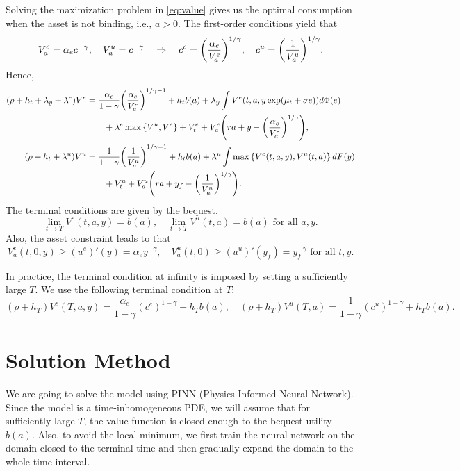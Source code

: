 \documentclass[a4paper, 12pt]{article}
\begin{document}
Solving the maximization problem in \cref{eq:value} gives us the optimal consumption 
when the asset is not binding, i.e., $a>0$. The first-order conditions yield that 
\begin{equation}
    V_a^e = \alpha_e c^{-\gamma}, \quad V_a^u = c^{-\gamma} 
    \quad \Rightarrow\quad 
    c^e = \pth{\frac{\alpha_e}{V^e_a}}^{1/\gamma}, \quad 
    c^u = \pth{\frac{1}{V^u_a}}^{1/\gamma}.
\end{equation}
Hence, 
\begin{align}
    (\rho + h_t + \lambda_y + \lambda^e)V^e &= \frac{\alpha_e}{1-\gamma}\pth{\frac{\alpha_e}{V^e_a}}^{1/\gamma - 1} + h_tb(a) + \lambda_y\int V^e(t,a,y\exp(\mu_t + \sigma e))d\Phi(e) \nonumber \\
    &\qquad + \lambda^e\max\set{V^u, V^e} + V^e_t + V^e_a\pth{ra + y - \pth{\frac{\alpha_e}{V^e_a}}^{1/\gamma}}, \label{eq:value_e}\\
    (\rho + h_t + \lambda^u)V^u &= \frac{1}{1-\gamma}\pth{\frac{1}{V^u_a}}^{1/\gamma - 1} + h_tb(a) + \lambda^u\int \max\set{V^e(t,a,y), V^u(t,a)}dF(y) \nonumber \\
    &\qquad + V^u_t + V^u_a\pth{ra + y_f - \pth{\frac{1}{V^u_a}}^{1/\gamma}}. \label{eq:value_u}
\end{align}
The terminal conditions are given by the bequest. 
\begin{equation}
    \lim_{t\to T} V^e(t,a,y) = b(a), \quad 
    \lim_{t\to T} V^u(t,a) = b(a) \text{ for all } a,y.
\end{equation}
Also, the asset constraint leads to that 
\begin{equation}
    V^e_a(t,0,y) \geq (u^e)'(y) = \alpha_e y^{-\gamma}, \quad
    V^u_a(t,0) \geq (u^u)'(y_f) = y_f^{-\gamma} \text{ for all } t,y. 
\end{equation}

In practice, the terminal condition at infinity is imposed by setting a sufficiently 
large $T$. We use the following terminal condition at $T$: 
\begin{equation}
    (\rho + h_T)V^e(T, a, y) = \frac{\alpha_e}{1-\gamma}(c^e)^{1-\gamma} + h_Tb(a), \quad 
    (\rho + h_T)V^u(T, a) = \frac{1}{1-\gamma}(c^u)^{1-\gamma} + h_Tb(a).
\end{equation}

\section{Solution Method}
We are going to solve the model using PINN (Physics-Informed Neural Network). 
Since the model is a time-inhomogeneous PDE, we will assume that for sufficiently 
large $T$, the value function is closed enough to the bequest utility $b(a)$. Also, 
to avoid the local minimum, we first train the neural network on the domain closed 
to the terminal time and then gradually expand the domain to the whole time interval. 
\end{document}
